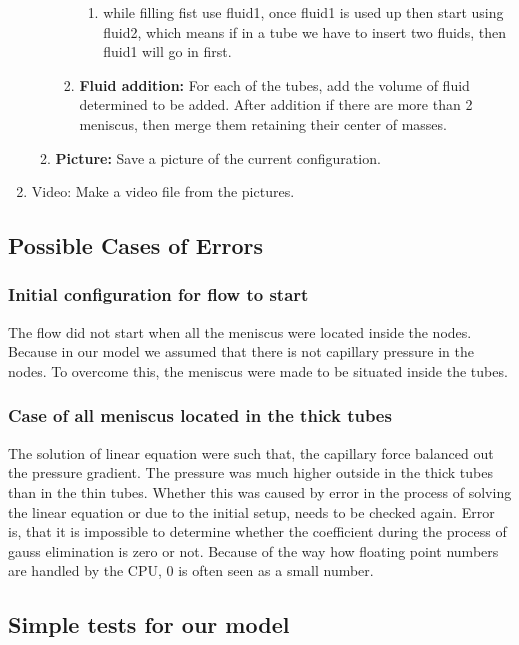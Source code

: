 \begin{enumerate}
\begin{enumerate}
\begin{enumerate}
\begin{enumerate}
						\item while filling fist use fluid1, once fluid1 is used up then start using fluid2, which means if in a tube we have to insert two fluids, then fluid1 will go in first.
					\end{enumerate}
				\item \textbf{Fluid addition:} For each of the tubes, add the volume of fluid determined to be added. After addition if there are more than 2 meniscus, then merge them retaining their center of masses.
				\end{enumerate}
			\item \textbf{Picture:} Save a picture of the current configuration.
			\end{enumerate}
		\item {Video:} Make a video file from the pictures.
	\end{enumerate}

\subsection{Possible Cases of Errors}

	\subsubsection{Initial configuration for flow to start}

	The flow did not start when all the meniscus were located inside the nodes. Because in our model we assumed that there is not capillary pressure in the nodes. To overcome this, the meniscus were made to be situated inside the tubes.

	\subsubsection{Case of all meniscus located in the thick tubes}

	The solution of linear equation were such that, the capillary force balanced out the pressure gradient. The pressure was much higher outside in the thick tubes than in the thin tubes. Whether this was caused by error in the process of solving the linear equation or due to the initial setup, needs to be checked again. Error is, that it is impossible to determine whether the coefficient during the process of gauss elimination is zero or not. Because of the way how floating point numbers are handled by the CPU, 0 is often seen as a small number.

\subsection{Simple tests for our model}
